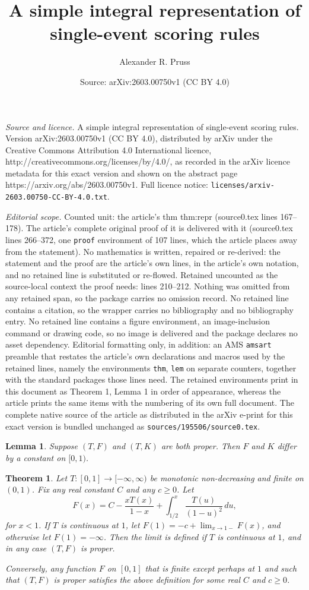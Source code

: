 \documentclass[10pt,a4paper]{amsart}
\title{A simple integral representation of single-event scoring rules}
\author{Alexander R. Pruss}
\date{Source: arXiv:2603.00750v1 (CC BY 4.0)}
\newtheorem{thm}{Theorem}
\newtheorem{lem}{Lemma}
\begin{document}
\maketitle

\noindent\emph{Source and licence.} A simple integral representation of single-event scoring rules. Version arXiv:2603.00750v1 (CC BY 4.0), distributed by arXiv under the Creative Commons Attribution 4.0 International licence, http://creativecommons.org/licenses/by/4.0/, as recorded in the arXiv licence metadata for this exact version and shown on the abstract page https://arxiv.org/abs/2603.00750v1. Full licence notice: \texttt{licenses/arxiv-2603.00750-CC-BY-4.0.txt}.\par\smallskip

\noindent\textit{Editorial scope.} Counted unit: the article's thm thm:repr (source0.tex lines 167--178). The article's complete original proof of it is delivered with it (source0.tex lines 266--372, one \texttt{proof} environment of 107 lines, which the article places away from the statement). No mathematics is written, repaired or re-derived: the statement and the proof are the article's own lines, in the article's own notation, and no retained line is substituted or re-flowed.  Retained uncounted as the source-local context the proof needs: lines 210--212.  Nothing was omitted from any retained span, so the package carries no omission record.  No retained line contains a citation, so the wrapper carries no bibliography and no bibliography entry.  No retained line contains a figure environment, an image-inclusion command or drawing code, so no image is delivered and the package declares no asset dependency.  Editorial formatting only, in addition: an AMS \texttt{amsart} preamble that restates the article's own declarations and macros used by the retained lines, namely the environments \texttt{thm}, \texttt{lem} on separate counters, together with the standard packages those lines need.  The retained environments print in this document as Theorem 1, Lemma 1 in order of appearance, whereas the article prints the same items with the numbering of its own full document.  The complete native source of the article as distributed in the arXiv e-print for this exact version is bundled unchanged as \texttt{sources/195506/source0.tex}.
\begin{lem}\label{lem:unique}
Suppose $(T,F)$ and $(T,K)$ are both proper. Then $F$ and $K$ differ by a constant on $[0,1)$.
\end{lem}

\begin{thm}\label{thm:repr}
Let $T:[0,1]\to[-\infty,\infty)$ be monotonic non-decreasing and finite on $(0,1)$.
Fix any real constant $C$ and any $c\ge 0$. Let
$$
	F(x) = C-\frac{xT(x)}{1-x}+\int_{1/2}^x \frac{T(u)}{(1-u)^2} \, du,
$$
for $x<1$. If $T$ is continuous at $1$, let $F(1)=-c+\lim_{x\to 1-} F(x)$, and otherwise
let $F(1)=-\infty$. Then the limit is defined if $T$ is continuous at $1$, and in any case $(T,F)$ is proper.

Conversely, any function $F$ on $[0,1]$ that is finite except perhaps at $1$ and such that
$(T,F)$ is proper satisfies the above definition for some real $C$ and $c\ge 0$. 
\end{thm}
\end{document}
